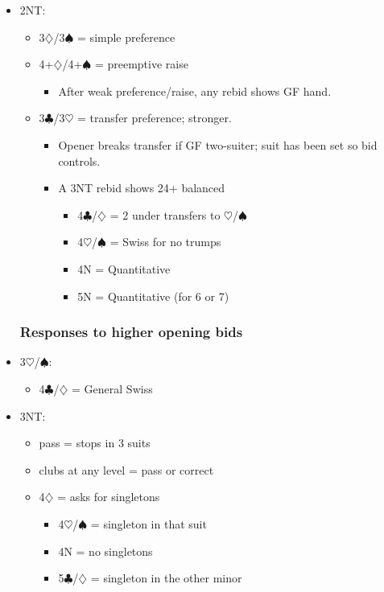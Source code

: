 \documentclass[a4paper,14pt]{extarticle}
\begin{document}
\begin{itemize}
\item 2NT:
	\begin{itemize}
   \item 3$\diamondsuit$/3$\spadesuit$ = simple preference
   \item 4+$\diamondsuit$/4+$\spadesuit$ = preemptive raise
		\begin{itemize}
      \item After weak preference/raise, any rebid shows GF hand.
		\end{itemize}
   \item 3$\clubsuit$/3$\heartsuit$ = transfer preference; stronger.
		\begin{itemize}
      \item Opener breaks transfer if GF two-suiter; suit has been set so bid controls.
      \item A 3NT rebid shows 24+ balanced
			\begin{itemize}
         \item 4$\clubsuit$/$\diamondsuit$ = 2 under transfers to $\heartsuit$/$\spadesuit$
         \item 4$\heartsuit$/$\spadesuit$ = Swiss for no trumps 
         \item 4N = Quantitative
         \item 5N = Quantitative (for 6 or 7)
			\end{itemize}
		\end{itemize}
	\end{itemize}

\newpage

\subsubsection{Responses to higher opening bids}
\label{sec:resp:higher}

\item 3$\heartsuit$/$\spadesuit$:
	\begin{itemize}
	\item 4$\clubsuit$/$\diamondsuit$ = General Swiss~
	\end{itemize}

\item 3NT:
	\begin{itemize}
	\item pass = stops in 3 suits
	\item clubs at any level = pass or correct
	\item 4$\diamondsuit$ = asks for singletons
		\begin{itemize}
		\item 4$\heartsuit$/$\spadesuit$ = singleton in that suit
		\item 4N = no singletons
		\item 5$\clubsuit$/$\diamondsuit$ = singleton in the other minor
		\end{itemize}
	\end{itemize}


\end{itemize}
\end{document}

